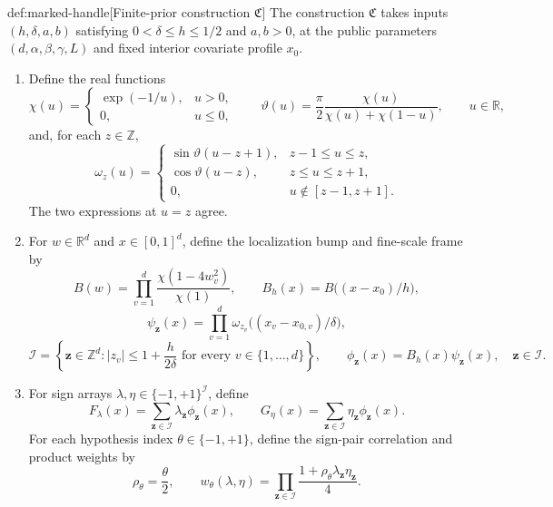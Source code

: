 \begin{algorithmv}{def:marked-handle}[Finite-prior construction \(\mathfrak C\)]
The construction \(\mathfrak C\) takes inputs \((h,\delta,a,b)\) satisfying \(0<\delta\le h\le1/2\) and \(a,b>0\), at the public parameters \((d,\alpha,\beta,\gamma,L)\) and fixed interior covariate profile \(x_0\).
\begin{enumerate}
\item Define the real functions
\[
\chi(u)=
\begin{cases}
\exp(-1/u),&u>0,\\
0,&u\le0,
\end{cases}
\qquad
\vartheta(u)=\frac{\pi}{2}\frac{\chi(u)}{\chi(u)+\chi(1-u)},
\qquad u\in\mathbb R,
\]
and, for each \(z\in\mathbb Z\),
\[
\omega_z(u)=
\begin{cases}
\sin\vartheta(u-z+1),&z-1\le u\le z,\\
\cos\vartheta(u-z),&z\le u\le z+1,\\
0,&u\notin[z-1,z+1].
\end{cases}
\]
The two expressions at \(u=z\) agree.

\item For \(w\in\mathbb R^d\) and \(x\in[0,1]^d\), define the localization bump and fine-scale frame by
\[
B(w)=\prod_{v=1}^d\frac{\chi(1-4w_v^2)}{\chi(1)},
\qquad
B_h(x)=B\bigl((x-x_0)/h\bigr),
\]
\[
\psi_{\mathbf z}(x)=
\prod_{v=1}^d
\omega_{z_v}\bigl((x_v-x_{0,v})/\delta\bigr),
\]
\[
\mathcal I=
\left\{\mathbf z\in\mathbb Z^d:
|z_v|\le1+\frac{h}{2\delta}
\text{ for every }v\in\{1,\ldots,d\}\right\},
\qquad
\phi_{\mathbf z}(x)=B_h(x)\psi_{\mathbf z}(x),
\quad \mathbf z\in\mathcal I.
\]

\item For sign arrays \(\lambda,\eta\in\{-1,+1\}^{\mathcal I}\), define
\[
F_\lambda(x)=
\sum_{\mathbf z\in\mathcal I}\lambda_{\mathbf z}\phi_{\mathbf z}(x),
\qquad
G_\eta(x)=
\sum_{\mathbf z\in\mathcal I}\eta_{\mathbf z}\phi_{\mathbf z}(x).
\]
For each hypothesis index \(\theta\in\{-1,+1\}\), define the sign-pair correlation and product weights by
\[
\rho_\theta=\frac{\theta}{2},
\qquad
w_\theta(\lambda,\eta)=
\prod_{\mathbf z\in\mathcal I}
\frac{1+\rho_\theta\lambda_{\mathbf z}\eta_{\mathbf z}}{4}.
\]


\end{enumerate}
\end{algorithmv}
